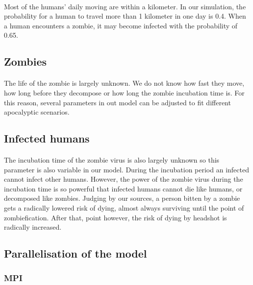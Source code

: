 \documentclass{article}
\begin{document}
\paragraph{}
Most of the humans' daily moving are within a kilometer. In our simulation, the probability for a human to travel more than 1 kilometer in one day is 0.4. When a human encounters a zombie, it may become infected with the probability of 0.65.

\subsection{Zombies}
\paragraph{}
The life of the zombie is largely unknown. We do not know how fast they move, how long before they decompose or how long the zombie incubation time is. For this reason, several parameters in out model can be adjusted to fit different apocalyptic scenarios.

\subsection{Infected humans}
\paragraph{}
The incubation time of the zombie virus is also largely unknown so this parameter is also variable in our model. During the incubation period an infected cannot infect other humans. However, the power of the zombie virus during the incubation time is so powerful that infected humans cannot die like humans, or decomposed like zombies. Judging by our sources\cite{deadheads}, a person bitten by a zombie gets a radically lowered risk of dying, almost always surviving until the point of zombiefication. After that, point however, the risk of dying by headshot is radically increased.

\subsection{Parallelisation of the model}
\subsubsection{MPI}
\end{document}
